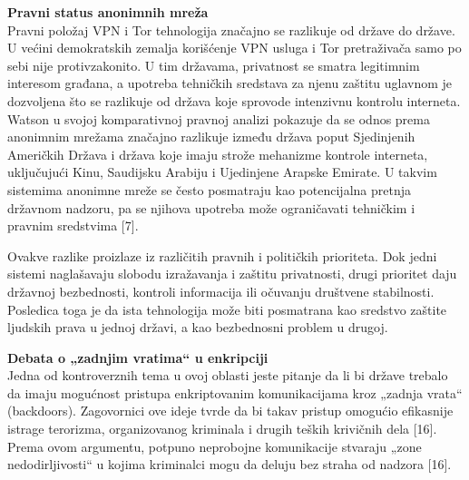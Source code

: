 \documentclass[
]{article}
\begin{document}
\textbf{Pravni status anonimnih mreža}\\
Pravni položaj VPN i Tor tehnologija značajno se razlikuje od države do
države. U većini demokratskih zemalja korišćenje VPN usluga i Tor
pretraživača samo po sebi nije protivzakonito. U tim državama,
privatnost se smatra legitimnim interesom građana, a upotreba tehničkih
sredstava za njenu zaštitu uglavnom je dozvoljena što se razlikuje od
država koje sprovode intenzivnu kontrolu interneta. Watson u svojoj
komparativnoj pravnoj analizi pokazuje da se odnos prema anonimnim
mrežama značajno razlikuje između država poput Sjedinjenih Američkih
Država i država koje imaju strože mehanizme kontrole interneta,
uključujući Kinu, Saudijsku Arabiju i Ujedinjene Arapske Emirate. U
takvim sistemima anonimne mreže se često posmatraju kao potencijalna
pretnja državnom nadzoru, pa se njihova upotreba može ograničavati
tehničkim i pravnim sredstvima {[}7{]}.

Ovakve razlike proizlaze iz različitih pravnih i političkih prioriteta.
Dok jedni sistemi naglašavaju slobodu izražavanja i zaštitu privatnosti,
drugi prioritet daju državnoj bezbednosti, kontroli informacija ili
očuvanju društvene stabilnosti. Posledica toga je da ista tehnologija
može biti posmatrana kao sredstvo zaštite ljudskih prava u jednoj
državi, a kao bezbednosni problem u drugoj.

\textbf{Debata o „zadnjim vratima`` u enkripciji}\\
Jedna od kontroverznih tema u ovoj oblasti jeste pitanje da li bi države
trebalo da imaju mogućnost pristupa enkriptovanim komunikacijama kroz
„zadnja vrata`` (backdoors). Zagovornici ove ideje tvrde da bi takav
pristup omogućio efikasnije istrage terorizma, organizovanog kriminala i
drugih teških krivičnih dela {[}16{]}. Prema ovom argumentu, potpuno
neprobojne komunikacije stvaraju „zone nedodirljivosti`` u kojima
kriminalci mogu da deluju bez straha od nadzora {[}16{]}.
\end{document}
